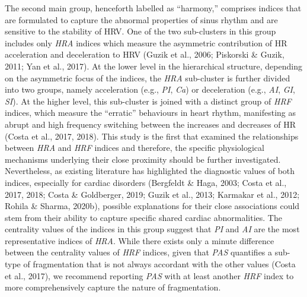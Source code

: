 \documentclass[
  english,
  jou,floatsintext]{apa6}
\begin{document}
The second main group, henceforth labelled as ``harmony,'' comprises indices that are formulated to capture the abnormal properties of sinus rhythm and are sensitive to the stability of HRV. One of the two sub-clusters in this group includes only \emph{HRA} indices which measure the asymmetric contribution of HR acceleration and deceleration to HRV (Guzik et al., 2006; Piskorski \& Guzik, 2011; Yan et al., 2017). At the lower level in the hierarchical structure, depending on the asymmetric focus of the indices, the \emph{HRA} sub-cluster is further divided into two groups, namely acceleration (e.g., \emph{PI}, \emph{Ca}) or deceleration (e.g., \emph{AI}, \emph{GI}, \emph{SI}). At the higher level, this sub-cluster is joined with a distinct group of \emph{HRF} indices, which measure the ``erratic'' behaviours in heart rhythm, manifesting as abrupt and high frequency switching between the increases and decreases of HR (Costa et al., 2017, 2018). This study is the first that examined the relationships between \emph{HRA} and \emph{HRF} indices and therefore, the specific physiological mechanisms underlying their close proximity should be further investigated. Nevertheless, as existing literature has highlighted the diagnostic values of both indices, especially for cardiac disorders (Bergfeldt \& Haga, 2003; Costa et al., 2017, 2018; Costa \& Goldberger, 2019; Guzik et al., 2013; Karmakar et al., 2012; Rohila \& Sharma, 2020b), possible explanations for their close associations could stem from their ability to capture specific shared cardiac abnormalities. The centrality values of the indices in this group suggest that \emph{PI} and \emph{AI} are the most representative indices of \emph{HRA}. While there exists only a minute difference between the centrality values of \emph{HRF} indices, given that \emph{PAS} quantifies a sub-type of fragmentation that is not always accordant with the other values (Costa et al., 2017), we recommend reporting \emph{PAS} with at least another \emph{HRF} index to more comprehensively capture the nature of fragmentation.
\end{document}

